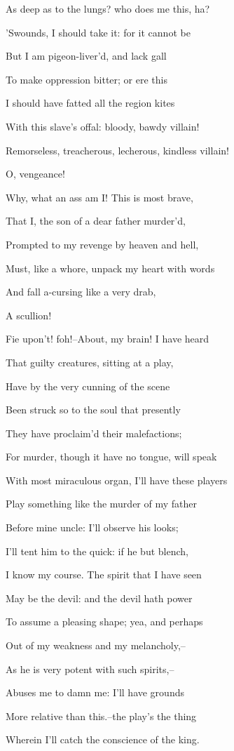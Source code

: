\documentclass[12pt]{book}
\begin{document}
As deep as to the lungs? who does me this, ha?

'Swounds, I should take it: for it cannot be

But I am pigeon-liver'd, and lack gall

To make oppression bitter; or ere this

I should have fatted all the region kites

With this slave's offal: bloody, bawdy villain!

Remorseless, treacherous, lecherous, kindless villain!

O, vengeance!

Why, what an ass am I! This is most brave,

That I, the son of a dear father murder'd,

Prompted to my revenge by heaven and hell,

Must, like a whore, unpack my heart with words

And fall a-cursing like a very drab,

A scullion!

Fie upon't! foh!--About, my brain! I have heard

That guilty creatures, sitting at a play,

Have by the very cunning of the scene

Been struck so to the soul that presently

They have proclaim'd their malefactions;

For murder, though it have no tongue, will speak

With most miraculous organ, I'll have these players

Play something like the murder of my father

Before mine uncle: I'll observe his looks;

I'll tent him to the quick: if he but blench,

I know my course. The spirit that I have seen

May be the devil: and the devil hath power

To assume a pleasing shape; yea, and perhaps

Out of my weakness and my melancholy,--

As he is very potent with such spirits,--

Abuses me to damn me: I'll have grounds

More relative than this.--the play's the thing

Wherein I'll catch the conscience of the king.
\end{document}
